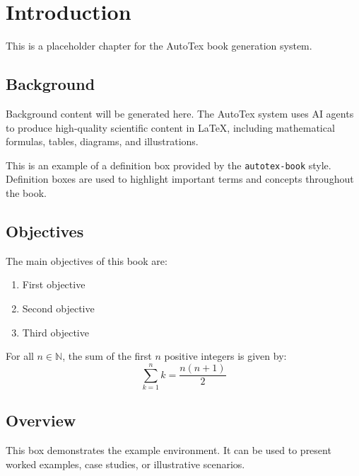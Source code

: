 \chapter{Introduction}
\label{ch:introduction}

This is a placeholder chapter for the AutoTex book generation system.

\section{Background}
\label{sec:background}

Background content will be generated here. The AutoTex system uses AI agents to produce
high-quality scientific content in \LaTeX{}, including mathematical formulas, tables,
diagrams, and illustrations.

\begin{definitionbox}
  This is an example of a definition box provided by the \texttt{autotex-book} style.
  Definition boxes are used to highlight important terms and concepts throughout the book.
\end{definitionbox}

\section{Objectives}
\label{sec:objectives}

The main objectives of this book are:

\begin{enumerate}
  \item First objective
  \item Second objective
  \item Third objective
\end{enumerate}

\begin{theorembox}
  For all $n \in \mathbb{N}$, the sum of the first $n$ positive integers is given by:
  \[
    \sum_{k=1}^{n} k = \frac{n(n+1)}{2}
  \]
\end{theorembox}

\section{Overview}
\label{sec:overview}

\begin{examplebox}
  This box demonstrates the example environment. It can be used to present
  worked examples, case studies, or illustrative scenarios.
\end{examplebox}

